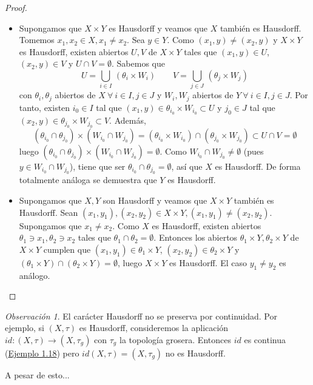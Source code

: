 \documentclass[12pt]{report}
\theoremstyle{definition}
\theoremstyle{definition}
\theoremstyle{remark}
\newtheorem*{obs}{Observación} %
\begin{document}
\begin{proof}
\hfill
\begin{itemize}
    \item[{\fbox[rb]{$\Rightarrow$}}] Supongamos que $X \times Y$ es Hausdorff y veamos que $X$ también es Hausdorff. Tomemos $x_1, x_2 \in X, x_1 \neq x_2$. Sea $y \in Y$. Como $(x_1,y) \neq (x_2,y)$ y $X \times Y$ es Hausdorff, existen abiertos $U,V$ de $X \times Y$ tales que $(x_1,y) \in U$, $(x_2,y) \in V$ y $U \cap V = \emptyset$. Sabemos que
    \[U = \bigcup_{i \in I} \, (\theta_i \times W_i) \qquad V = \bigcup_{j \in J} \, (\theta_j \times W_j)\]
    con $\theta_i, \theta_j$ abiertos de $X \ \forall \ i \in I, j \in J$ y $W_i, W_j$ abiertos de $Y \ \forall \ i \in I, j \in J$. Por tanto, existen $i_0 \in I$ tal que $(x_1,y) \in \theta_{i_0} \times W_{i_0} \subset U$ y $j_0 \in J$ tal que $(x_2,y) \in \theta_{j_0} \times W_{j_0} \subset V$. Además,
    \[(\theta_{i_0} \cap \theta_{j_0}) \times (W_{i_0} \cap W_{j_0}) = (\theta_{i_0} \times W_{i_0}) \cap (\theta_{j_0} \times W_{j_0}) \subset U \cap V = \emptyset\]
    luego $(\theta_{i_0} \cap \theta_{j_0}) \times (W_{i_0} \cap W_{j_0}) = \emptyset$. Como $W_{i_0} \cap W_{j_0} \neq \emptyset$ (pues $y \in W_{i_0} \cap W_{j_0}$), tiene que ser $\theta_{i_0} \cap \theta_{j_0} = \emptyset$, así que $X$ es Hausdorff. De forma totalmente análoga se demuestra que $Y$ es Hausdorff.
    \item[{\fbox[rb]{$\Leftarrow$}}] Supongamos que $X,Y$ son Hausdorff y veamos que $X \times Y$ también es Hausdorff. Sean $(x_1,y_1),(x_2,y_2) \in X \times Y, (x_1,y_1) \neq (x_2,y_2)$. Supongamos que $x_1 \neq x_2$. Como $X$ es Hausdorff, existen abiertos $\theta_1 \ni x_1, \theta_2 \ni x_2$ tales que $\theta_1 \cap \theta_2 = \emptyset$. Entonces los abiertos $\theta_1 \times Y, \theta_2 \times Y$ de $X \times Y$ cumplen que $(x_1,y_1) \in \theta_1 \times Y$, $(x_2,y_2) \in \theta_2 \times Y$ y $(\theta_1 \times Y) \cap (\theta_2 \times Y) = \emptyset$, luego $X \times Y$ es Hausdorff. El caso $y_1 \neq y_2$ es análogo.
\end{itemize}
\end{proof}

\begin{obs}
El carácter Hausdorff no se preserva por continuidad. Por ejemplo, si $(X,\tau)$ es Hausdorff, consideremos la aplicación $id \colon (X,\tau) \to (X,\tau_g)$ con $\tau_g$ la topología grosera. Entonces $id$ es continua (\hyperref[ex1.18.]{\color{blue}Ejemplo 1.18}) pero $id(X,\tau) = (X,\tau_g)$ no es Hausdorff.
\end{obs}
A pesar de esto...
\end{document}
